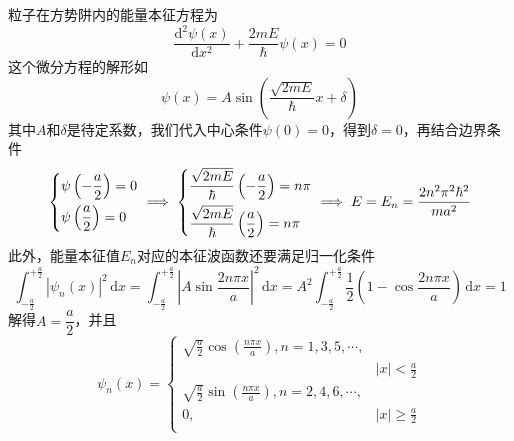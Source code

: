 \begin{solution}
    粒子在方势阱内的能量本征方程为
    $$
        \frac{\mathrm{d}^2\psi(x)}{\mathrm{d}x^2}+\frac{2mE}{\hbar}\psi(x)=0
    $$
    这个微分方程的解形如
    $$
        \psi(x)=A\sin\left(\frac{\sqrt{2mE}}{\hbar}x+\delta\right)
    $$
    其中$A$和$\delta$是待定系数，我们代入中心条件$\psi(0)=0$，得到$\delta=0$，再结合边界条件
    $$
        \begin{dcases}
            \psi\left(-\frac{a}{2}\right) = 0 \\
            \psi\left(\frac{a}{2}\right) = 0
        \end{dcases}
        \implies
        \begin{dcases}
            \frac{\sqrt{2mE}}{\hbar}\left(-\frac{a}{2}\right)= n\pi \\
            \frac{\sqrt{2mE}}{\hbar}\left(\frac{a}{2}\right) = n\pi
        \end{dcases}
        \implies
        E = E_n = \frac{2n^2\pi^2\hbar^2}{ma^2}
    $$
    此外，能量本征值$E_n$对应的本征波函数还要满足归一化条件
    $$
        \int_{-\frac{a}{2}}^{+\frac{a}{2}}|\psi_n(x)|^2\,\mathrm{d}x
        = \int_{-\frac{a}{2}}^{+\frac{a}{2}}\left|A\sin\frac{2n\pi x}{a}\right|^2\,\mathrm{d}x
        = A^2\int_{-\frac{a}{2}}^{+\frac{a}{2}}\frac{1}{2}\left(1-\cos\frac{2n\pi x}{a}\right)\,\mathrm{d}x
        = 1
    $$
    解得$A=\dfrac{a}{2}$，并且
    $$
        \psi_n(x) = \begin{cases}
            \sqrt{\frac{a}{2}}\cos\left(\frac{n\pi x}{a}\right), n=1,3,5,\cdots, \\
               & |x|<\frac{a}{2}                                                 \\
            \sqrt{\frac{a}{2}}\sin\left(\frac{n\pi x}{a}\right), n=2,4,6,\cdots, \\
            0, & |x|\geqslant\frac{a}{2}                                         \\
        \end{cases}
    $$
\end{solution}




